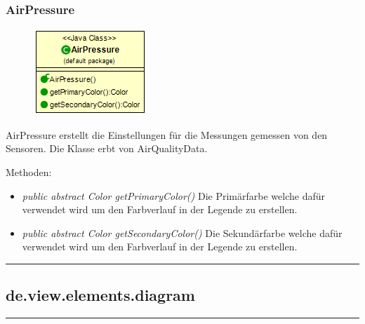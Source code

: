 \subsubsection{AirPressure}
\begin{minipage}{0.3\textwidth}
    \begin{figure}[H]
        {\centering\includegraphics[scale = 0.6
        ]{media/view/airquality/AirPressure_Class.png}}
    \end{figure}
    \end{minipage} \hfill
    \begin{minipage}{0.6\textwidth}
AirPressure erstellt die Einstellungen für die Messungen gemessen von den Sensoren. Die Klasse erbt von AirQualityData.
\end{minipage}
\vspace{\baselineskip}
Methoden: \begin{itemize} [noitemsep]
    \item \emph{public abstract Color getPrimaryColor()} Die Primärfarbe welche dafür verwendet wird um den Farbverlauf in der Legende zu erstellen.
    \item \emph{public abstract Color getSecondaryColor()} Die Sekundärfarbe welche dafür verwendet wird um den Farbverlauf in der Legende zu erstellen.
\end{itemize}


\rule{\textwidth}{0.4pt}
\subsection{de.view.elements.diagram}

\rule{\textwidth}{0.4pt}

